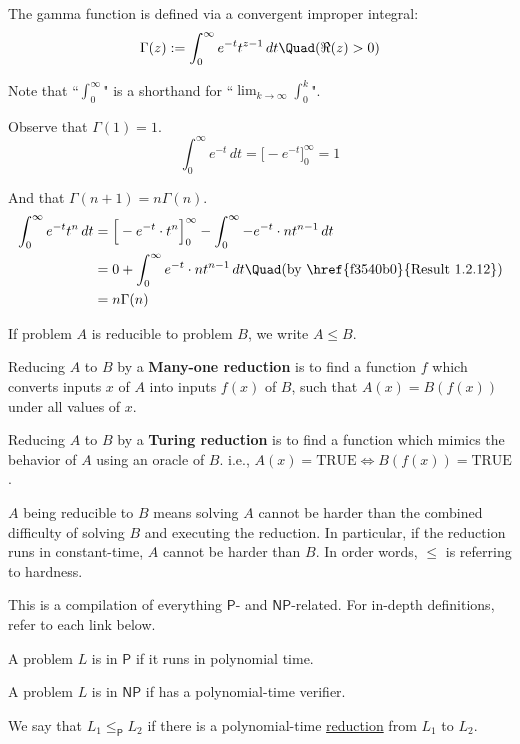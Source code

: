 \label{ce1fa3f}

The gamma function is defined via a convergent improper integral:
$$
  \Gamma(z):=\int_0^\infty e^{-t}t^{z-1}\,dt\Quad(\Re(z)>0)
$$

Note that ``$\displaystyle\int_0^\infty$" is a shorthand for
``$\displaystyle\lim_{k\to\infty}\int_0^k$".

Observe that $\Gamma(1)=1$.
$$\int_0^\infty e^{-t}\,dt=\Big[-e^{-t}\Big]_0^\infty=1$$

And that $\Gamma(n+1)=n\Gamma(n)$.
\begin{align*}
  \int_0^\infty e^{-t}t^n\,dt
   & = \Big[-e^{-t}\cdot t^n\Big]_0^\infty-\int_0^\infty-e^{-t}\cdot nt^{n-1}\,dt              \\
   & = 0+\int_0^\infty e^{-t}\cdot nt^{n-1}\,dt \Quad\text{(by \href{f3540b0}{Result 1.2.12})} \\
   & = n\Gamma(n)
\end{align*}

\label{e009acb}

If problem $A$ is reducible to problem $B$, we write $A\leq B$.

Reducing $A$ to $B$ by a \textbf{Many-one reduction} is to find a function $f$
which converts inputs $x$ of $A$ into inputs $f(x)$ of $B$, such that
$A(x)=B(f(x))$ under all values of $x$.

Reducing $A$ to $B$ by a \textbf{Turing reduction} is to find a function which
mimics the behavior of $A$ using an oracle of $B$. i.e., $A(x)=\text{TRUE}\iff
B(f(x))=\text{TRUE}$.

$A$ being reducible to $B$ means solving $A$ cannot be harder than the
combined difficulty of solving $B$ and executing the reduction. In
particular, if the reduction runs in constant-time, $A$ cannot be
harder than $B$. In order words, $\leq$ is referring to hardness.

\label{e04bcbc}

This is a compilation of everything $\mathsf P$- and $\mathsf{NP}$-related. For
in-depth definitions, refer to each link below.

A problem $L$ is in $\mathsf P$ if it runs in polynomial time.

A problem $L$ is in $\mathsf{NP}$ if has a polynomial-time verifier.

We say that $L_1\leq_{\mathsf P}L_2$ if there is a polynomial-time
\href{e009acb}{reduction} from $L_1$ to $L_2$.


